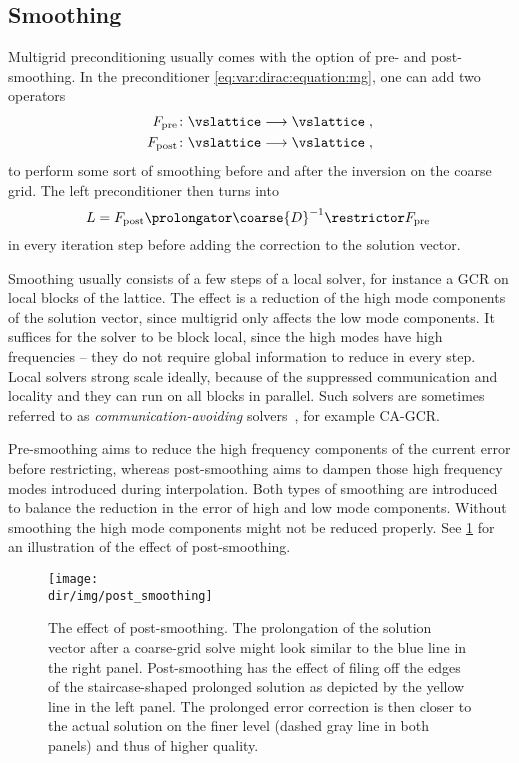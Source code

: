 \subsection{Smoothing}

Multigrid preconditioning usually comes with the option of pre- and post-smoothing.
In the preconditioner \cref{eq:var:dirac:equation:mg}, one can add two operators
\begin{align}
F_{\text{pre}}  &\colon \vslattice \longrightarrow \vslattice \;, \\
F_{\text{post}} &\colon \vslattice \longrightarrow \vslattice \;,
\end{align}
to perform some sort of smoothing before and after the inversion on the coarse grid.
The left preconditioner then turns into
\begin{equation}
L = F_{\text{post}} \prolongator \coarse{D}^{-1} \restrictor F_{\text{pre}} \;
\end{equation}
in every iteration step before adding the correction to the solution vector.

Smoothing usually consists of a few steps of a local solver, for instance a GCR on local blocks of the lattice.
The effect is a reduction of the high mode components of the solution vector, since multigrid only affects the low mode components.
It suffices for the solver to be block local, since the high modes have high frequencies -- they do not require global information to reduce in every step.
Local solvers strong scale ideally, because of the suppressed communication and locality and they can run on all blocks in parallel.
Such solvers are sometimes referred to as \emph{communication-avoiding} solvers~\cite{naumov2016s}, for example CA-GCR.

Pre-smoothing aims to reduce the high frequency components of the current error before restricting, whereas post-smoothing aims to dampen those high frequency modes introduced during interpolation.
Both types of smoothing are introduced to balance the reduction in the error of high and low mode components.
Without smoothing the high mode components might not be reduced properly.
See \cref{fig:post:smoothing} for an illustration of the effect of post-smoothing.
\begin{figure}
    \centering
    \texttt{[image: \\dir/img/post\_smoothing]}
    \caption{The effect of post-smoothing. The prolongation of the solution vector after a coarse-grid solve might look similar to the blue line in the right panel. Post-smoothing has the effect of filing off the edges of the staircase-shaped prolonged solution as depicted by the yellow line in the left panel. The prolonged error correction is then closer to the actual solution on the finer level (dashed gray line in both panels) and thus of higher quality.}
    \label{fig:post:smoothing}
\end{figure}

